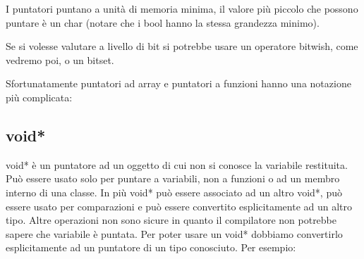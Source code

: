 \documentclass[11pt,a4paper]{book}
\begin{document}
I puntatori puntano a unità di memoria minima, il valore più piccolo che possono puntare è un char (notare che i bool hanno la stessa grandezza minimo).

Se si volesse valutare a livello di bit si potrebbe usare un operatore bitwish, come vedremo poi, o un bitset.

Sfortunatamente puntatori ad array e puntatori a funzioni hanno una notazione più complicata:
\label{code: 079}

\subsection{void*}
void* è un puntatore ad un oggetto di cui non si conosce la variabile restituita. Può essere usato solo per puntare a variabili, non a funzioni o ad un membro interno di una classe. In più void* può essere associato ad un altro void*, può essere usato per comparazioni e può essere convertito esplicitamente ad un altro tipo. Altre operazioni non sono sicure in quanto il compilatore non potrebbe sapere che variabile è puntata. Per poter usare un void* dobbiamo convertirlo esplicitamente ad un puntatore di un tipo conosciuto. Per esempio:
\label{code: 080}
\end{document}

